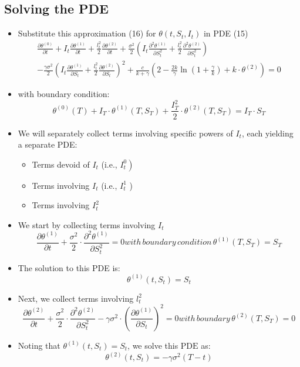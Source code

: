 \documentclass[10pt]{article}
\begin{document}
\subsection{Solving the PDE}

\begin{itemize} 
    \item Substitute this approximation (16) for $\theta\left(t, S_{t}, I_{t}\right)$ in PDE (15)
    $$
    \begin{array}{l}
    \frac{\partial \theta^{(0)}}{\partial t}+I_{t} \frac{\partial \theta^{(1)}}{\partial t}+\frac{l_{t}^{2}}{2} \frac{\partial \theta^{(2)}}{\partial t}+\frac{\sigma^{2}}{2}\left(I_{t} \frac{\partial^{2} \theta^{(1)}}{\partial S_{t}^{2}}+\frac{l_{t}^{2}}{2} \frac{\partial^{2} \theta^{(2)}}{\partial S_{t}^{2}}\right) \\
    -\frac{\gamma \sigma^{2}}{2}\left(I_{t} \frac{\partial \theta^{(1)}}{\partial S_{t}}+\frac{l_{t}^{2}}{2} \frac{\partial \theta^{(2)}}{\partial S_{t}}\right)^{2}+\frac{c}{k+\gamma}\left(2-\frac{2 k}{\gamma} \ln \left(1+\frac{\gamma}{k}\right)+k \cdot \theta^{(2)}\right)=0
    \end{array}
    $$
    \item with boundary condition:
    \[
    \theta^{(0)}(T)+I_{T} \cdot \theta^{(1)}\left(T, S_{T}\right)+\frac{I_{T}^{2}}{2} \cdot \theta^{(2)}\left(T, S_{T}\right)=I_{T} \cdot S_{T} \tag{17}
    \]
    \item We will separately collect terms involving specific powers of $I_{t}$, each yielding a separate PDE:
    \begin{itemize} 
        \item Terms devoid of $I_{t}$ (i.e., $\left.I_{t}^{0}\right)$
        \item Terms involving $I_{t}$ (i.e., $I_{t}^{1}$ )
        \item Terms involving $I_{t}^{2}$
    \end{itemize}
\end{itemize}

\begin{itemize} 
    \item We start by collecting terms involving $I_{t}$
    $$
    \frac{\partial \theta^{(1)}}{\partial t}+\frac{\sigma^{2}}{2} \cdot \frac{\partial^{2} \theta^{(1)}}{\partial S_{t}^{2}}=0 with\, boundary\, condition\, \theta^{(1)}\left(T, S_{T}\right)=S_{T}
    $$
    \item The solution to this PDE is:
    \[
    \theta^{(1)}\left(t, S_{t}\right)=S_{t} \tag{18}
    \]
    \item Next, we collect terms involving $l_{t}^{2}$
    $$
    \frac{\partial \theta^{(2)}}{\partial t}+\frac{\sigma^{2}}{2} \cdot \frac{\partial^{2} \theta^{(2)}}{\partial S_{t}^{2}}-\gamma \sigma^{2} \cdot\left(\frac{\partial \theta^{(1)}}{\partial S_{t}}\right)^{2}=0 with\, boundary\, \theta^{(2)}\left(T, S_{T}\right)=0
    $$
    \item Noting that $\theta^{(1)}\left(t, S_{t}\right)=S_{t}$, we solve this $\mathrm{PDE}$ as:
    \[
    \theta^{(2)}\left(t, S_{t}\right)=-\gamma \sigma^{2}(T-t) \tag{19}
    \]
\end{itemize}
\end{document}
